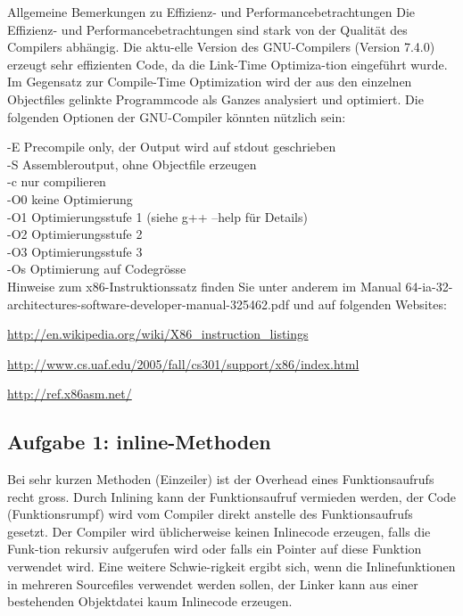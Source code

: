 Allgemeine Bemerkungen zu Effizienz- und Performancebetrachtungen
Die Effizienz- und Performancebetrachtungen sind stark von der Qualität des Compilers abhängig. Die aktu-elle Version des GNU-Compilers (Version 7.4.0) erzeugt sehr effizienten Code, da die Link-Time Optimiza-tion eingeführt wurde. Im Gegensatz zur Compile-Time Optimization wird der aus den einzelnen Objectfiles gelinkte Programmcode als Ganzes analysiert und optimiert.
Die folgenden Optionen der GNU-Compiler könnten nützlich sein:

\medskip
\noindent
-E \qquad Precompile only, der Output wird auf stdout geschrieben \\
-S \qquad Assembleroutput, ohne Objectfile erzeugen\\
-c \qquad nur compilieren\\
-O0 \qquad keine Optimierung\\
-O1 \qquad Optimierungsstufe 1 (siehe g++ --help für Details)\\
-O2 \qquad Optimierungsstufe 2\\
-O3 \qquad Optimierungsstufe 3\\
-Os \qquad Optimierung auf Codegrösse\\

Hinweise zum x86-Instruktionssatz finden Sie unter anderem im Manual 64-ia-32-architectures-software-developer-manual-325462.pdf und auf folgenden Websites:

\url{http://en.wikipedia.org/wiki/X86_instruction_listings}

\url{http://www.cs.uaf.edu/2005/fall/cs301/support/x86/index.html}

\url{http://ref.x86asm.net/}

\subsection{Aufgabe 1: inline-Methoden}

Bei sehr kurzen Methoden (Einzeiler) ist der Overhead eines Funktionsaufrufs recht gross. Durch Inlining kann der Funktionsaufruf vermieden werden, der Code (Funktionsrumpf) wird vom Compiler direkt anstelle des Funktionsaufrufs gesetzt. Der Compiler wird üblicherweise keinen Inlinecode erzeugen, falls die Funk-tion rekursiv aufgerufen wird oder falls ein Pointer auf diese Funktion verwendet wird. Eine weitere Schwie-rigkeit ergibt sich, wenn die Inlinefunktionen in mehreren Sourcefiles verwendet werden sollen, der Linker kann aus einer bestehenden Objektdatei kaum Inlinecode erzeugen.

